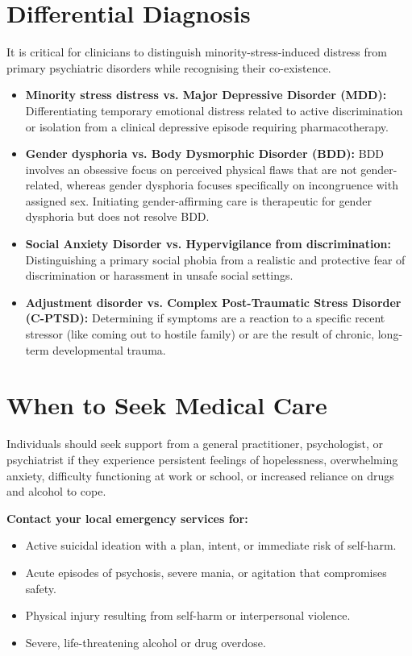 \section*{Differential Diagnosis}
It is critical for clinicians to distinguish minority-stress-induced distress from primary psychiatric disorders while recognising their co-existence.
\begin{itemize}
    \item \textbf{Minority stress distress vs. Major Depressive Disorder (MDD):} Differentiating temporary emotional distress related to active discrimination or isolation from a clinical depressive episode requiring pharmacotherapy.
    \item \textbf{Gender dysphoria vs. Body Dysmorphic Disorder (BDD):} BDD involves an obsessive focus on perceived physical flaws that are not gender-related, whereas gender dysphoria focuses specifically on incongruence with assigned sex. Initiating gender-affirming care is therapeutic for gender dysphoria but does not resolve BDD.
    \item \textbf{Social Anxiety Disorder vs. Hypervigilance from discrimination:} Distinguishing a primary social phobia from a realistic and protective fear of discrimination or harassment in unsafe social settings.
    \item \textbf{Adjustment disorder vs. Complex Post-Traumatic Stress Disorder (C-PTSD):} Determining if symptoms are a reaction to a specific recent stressor (like coming out to hostile family) or are the result of chronic, long-term developmental trauma.
\end{itemize}

\section*{When to Seek Medical Care}
Individuals should seek support from a general practitioner, psychologist, or psychiatrist if they experience persistent feelings of hopelessness, overwhelming anxiety, difficulty functioning at work or school, or increased reliance on drugs and alcohol to cope.

\textbf{Contact your local emergency services for:}
\begin{itemize}
    \item Active suicidal ideation with a plan, intent, or immediate risk of self-harm.
    \item Acute episodes of psychosis, severe mania, or agitation that compromises safety.
    \item Physical injury resulting from self-harm or interpersonal violence.
    \item Severe, life-threatening alcohol or drug overdose.
\end{itemize}

